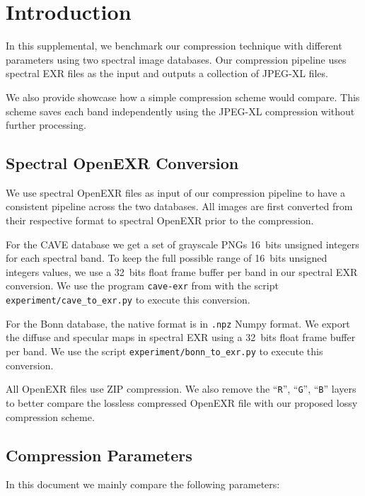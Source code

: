 \section{Introduction}

In this supplemental, we benchmark our compression technique with different parameters using two spectral image databases. Our compression pipeline uses spectral EXR files as the input and outputs a collection of JPEG-XL files.

We also provide showcase how a simple compression scheme would compare. This scheme saves each band independently using the JPEG-XL compression without further processing.


\subsection{Spectral OpenEXR Conversion}

We use spectral OpenEXR files as input of our compression pipeline to have a consistent pipeline across the two databases. All images are first converted from their respective format to spectral OpenEXR prior to the compression.

For the CAVE database we get a set of grayscale PNGs 16~bits unsigned integers for each spectral band. To keep the full possible range of 16~bits unsigned integers values, we use a 32~bits float frame buffer per band in our spectral EXR conversion. We use the program \verb?cave-exr? from with the script \verb?experiment/cave_to_exr.py? to execute this conversion.

For the Bonn database, the native format is in \verb?.npz? Numpy format. We export the diffuse and specular maps in spectral EXR using a 32~bits float frame buffer per band. We use the script \verb?experiment/bonn_to_exr.py? to execute this conversion.

All OpenEXR files use ZIP compression. We also remove the ``\verb?R?'', ``\verb?G?'', ``\verb?B?'' layers to better compare the lossless compressed OpenEXR file with our proposed lossy compression scheme.


\subsection{Compression Parameters}

In this document we mainly compare the following parameters:

